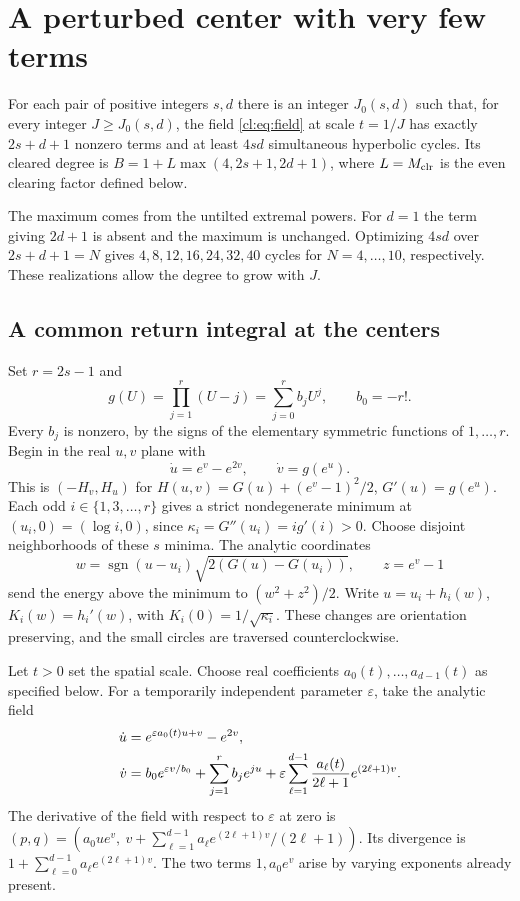 \section{A perturbed center with very few terms}\label{cl:sec:center-lift}
\begin{theorem}\label{cl:thm:main}
For each pair of positive integers \(s,d\) there is an integer \(J_0(s,d)\) such that, for every integer \(J\ge J_0(s,d)\), the field \eqref{cl:eq:field} at scale \(t=1/J\) has exactly \(2s+d+1\) nonzero terms and at least \(4sd\) simultaneous hyperbolic cycles. Its cleared degree is \(B=1+L\max(4,2s+1,2d+1)\), where \(L=M_{\mathrm{clr}}\) is the even clearing factor defined below.
\end{theorem}
The maximum comes from the untilted extremal powers. For \(d=1\) the term giving \(2d+1\) is absent and the maximum is unchanged. Optimizing \(4sd\) over \(2s+d+1=N\) gives \(4,8,12,16,24,32,40\) cycles for \(N=4,\ldots,10\), respectively. These realizations allow the degree to grow with \(J\).

\subsection{A common return integral at the centers}

Set \(r=2s-1\) and
\[
 g(U)=\prod_{j=1}^r(U-j)=\sum_{j=0}^r b_jU^j,\qquad b_0=-r!.
\]
Every \(b_j\) is nonzero, by the signs of the elementary symmetric
functions of \(1,\ldots,r\). Begin in the real \(u,v\) plane with
\[
 \dot u=e^v-e^{2v},\qquad \dot v=g(e^u).
\]
This is \((-H_v,H_u)\) for
\(H(u,v)=G(u)+(e^v-1)^2/2\), \(G'(u)=g(e^u)\).
Each odd \(i\in\{1,3,\ldots,r\}\) gives a strict nondegenerate minimum
at \((u_i,0)=(\log i,0)\), since \(\kappa_i=G''(u_i)=i g'(i)>0\).
Choose disjoint neighborhoods of these \(s\) minima. The analytic
coordinates
\[
 w=\operatorname{sgn}(u-u_i)\sqrt{2(G(u)-G(u_i))},\qquad z=e^v-1
\]
send the energy above the minimum to \((w^2+z^2)/2\).
Write \(u=u_i+h_i(w)\), \(K_i(w)=h_i'(w)\), with
\(K_i(0)=1/\sqrt{\kappa_i}\). These changes are orientation preserving,
and the small circles are traversed counterclockwise.

Let \(t>0\) set the spatial scale. Choose real coefficients
\(a_0(t),\ldots,a_{d-1}(t)\) as specified below. For a temporarily
independent parameter \(\varepsilon\), take the analytic field
\begin{align}
 \dot u&=e^{\varepsilon a_0(t)u+v}-e^{2v},\notag\\
 \dot v&= b_0 e^{\varepsilon v/b_0}+
          \sum_{j=1}^r b_j e^{ju}
          +\varepsilon\sum_{\ell=1}^{d-1}
            \frac{a_\ell(t)}{2\ell+1}e^{(2\ell+1)v}.
 \label{cl:eq:analytic}
\end{align}
The derivative of the field with respect to \(\varepsilon\) at zero
is \((p,q)=(a_0 u e^v,\ v+\sum_{\ell=1}^{d-1}a_\ell e^{(2\ell+1)v}/(2\ell+1))\).
Its divergence is \(1+\sum_{\ell=0}^{d-1}a_\ell e^{(2\ell+1)v}\).
The two terms \(1,a_0e^v\) arise by varying exponents already present.

